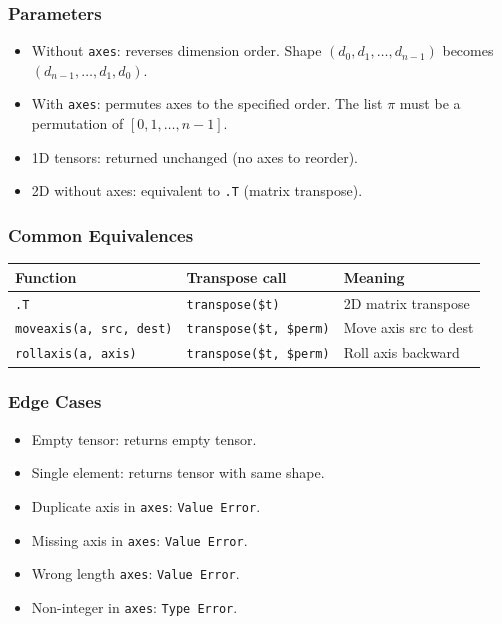 \subsubsection{Parameters}
\begin{itemize}
\item Without \texttt{axes}: reverses dimension order. Shape $(d_0, d_1, \ldots, d_{n-1})$ becomes $(d_{n-1}, \ldots, d_1, d_0)$.
\item With \texttt{axes}: permutes axes to the specified order. The list $\pi$ must be a permutation of $[0, 1, \ldots, n{-}1]$.
\item 1D tensors: returned unchanged (no axes to reorder).
\item 2D without axes: equivalent to \texttt{.T} (matrix transpose).
\end{itemize}

\subsubsection{Common Equivalences}
\begin{center}
\begin{tabular}{lll}
\textbf{Function} & \textbf{Transpose call} & \textbf{Meaning} \\ \hline
\texttt{.T} & \texttt{transpose(\$t)} & 2D matrix transpose \\
\texttt{moveaxis(a, src, dest)} & \texttt{transpose(\$t, \$perm)} & Move axis src to dest \\
\texttt{rollaxis(a, axis)} & \texttt{transpose(\$t, \$perm)} & Roll axis backward \\
\end{tabular}
\end{center}

\subsubsection{Edge Cases}
\begin{itemize}
\item Empty tensor: returns empty tensor.
\item Single element: returns tensor with same shape.
\item Duplicate axis in \texttt{axes}: \texttt{Value Error}.
\item Missing axis in \texttt{axes}: \texttt{Value Error}.
\item Wrong length \texttt{axes}: \texttt{Value Error}.
\item Non-integer in \texttt{axes}: \texttt{Type Error}.
\end{itemize}

